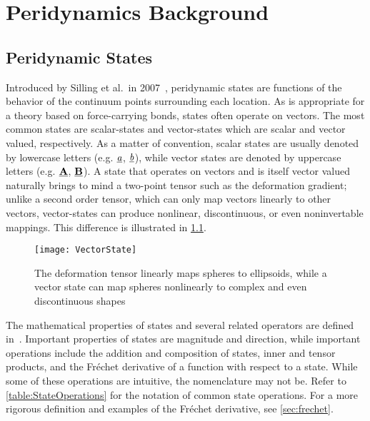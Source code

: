 \chapter{Peridynamics Background}

\section{Peridynamic States}
%
Introduced by Silling et al.\ in 2007~\cite{silling2007peridynamic}, peridynamic states are functions of the behavior of the continuum points surrounding each location.
As is appropriate for a theory based on force-carrying bonds, states often operate on vectors.
The most common states are scalar-states and vector-states which are scalar and vector valued, respectively.
As a matter of convention, scalar states are usually denoted by lowercase letters (e.g. $\sstate{a}{}{}$, $\sstate{b}{}{}$), while vector states are denoted by uppercase letters (e.g. $\vstate{A}{}{}$, $\vstate{B}{}{}$).
A state that operates on vectors and is itself vector valued naturally brings to mind a two-point tensor such as the deformation gradient;
unlike a second order tensor, which can only map vectors linearly to other vectors, vector-states can produce nonlinear, discontinuous, or even noninvertable mappings.  
This difference is illustrated in \cref{fig:VectorState}.
%
\begin{figure}[h]
  \centering
\texttt{[image: VectorState]}
\caption[Deformation tensor vs. deformation vector state]{The deformation tensor linearly maps spheres to ellipsoids, while a vector state can map spheres nonlinearly to complex and even discontinuous shapes \cite{silling2007peridynamic}}
\label{fig:VectorState}
\end{figure}
%

The mathematical properties of states and several related operators are defined in~\cite{silling2007peridynamic}.
Important properties of states are magnitude and direction, while important operations include the addition and composition of states, inner and tensor products, and the Fr\'{e}chet derivative of a function with respect to a state.
While some of these operations are intuitive, the nomenclature may not be.
Refer to \cref{table:StateOperations} for the notation of common state operations.
For a more rigorous definition and examples of the Fr\'echet derivative, see \cref{sec:frechet}.

